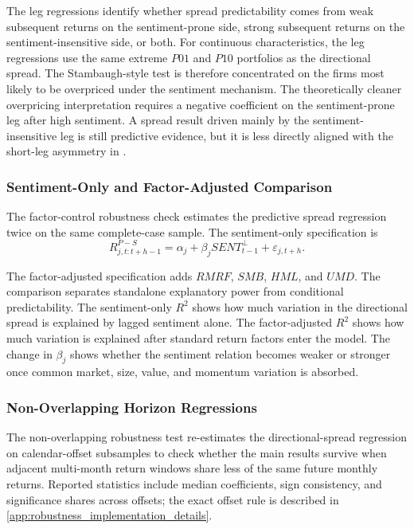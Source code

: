 \documentclass[11pt]{article}
\newcommand{\var}[1]{\ensuremath{#1}}
\begin{document}
The leg regressions identify whether spread predictability comes from weak subsequent returns on the sentiment-prone side, strong subsequent returns on the sentiment-insensitive side, or both. For continuous characteristics, the leg regressions use the same extreme \var{P01} and \var{P10} portfolios as the directional spread. The Stambaugh-style test is therefore concentrated on the firms most likely to be overpriced under the sentiment mechanism. The theoretically cleaner overpricing interpretation requires a negative coefficient on the sentiment-prone leg after high sentiment. A spread result driven mainly by the sentiment-insensitive leg is still predictive evidence, but it is less directly aligned with the short-leg asymmetry in \citet{stambaugh2012short}.

\subsubsection{Sentiment-Only and Factor-Adjusted Comparison}
The factor-control robustness check estimates the predictive spread regression twice on the same complete-case sample. The sentiment-only specification is
\begin{equation}
    R^{P-S}_{j,t:t+h-1}
    =
    \alpha_j
    + \beta_j SENT^{\perp}_{t-1}
    + \varepsilon_{j,t+h}.
\end{equation}

The factor-adjusted specification adds \var{RMRF}, \var{SMB}, \var{HML}, and \var{UMD}. The comparison separates standalone explanatory power from conditional predictability. The sentiment-only \var{R^2} shows how much variation in the directional spread is explained by lagged sentiment alone. The factor-adjusted \var{R^2} shows how much variation is explained after standard return factors enter the model. The change in \var{\beta_j} shows whether the sentiment relation becomes weaker or stronger once common market, size, value, and momentum variation is absorbed.

\subsubsection{Non-Overlapping Horizon Regressions}
The non-overlapping robustness test re-estimates the directional-spread regression on calendar-offset subsamples to check whether the main results survive when adjacent multi-month return windows share less of the same future monthly returns. Reported statistics include median coefficients, sign consistency, and significance shares across offsets; the exact offset rule is described in \cref{app:robustness_implementation_details}.
\end{document}
